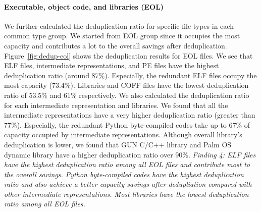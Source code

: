 \paragraph{Executable, object code, and libraries (EOL)}
We further calculated the deduplication ratio for specific file types in each common type group. We started from EOL group since it occupies the most capacity and contributes a lot to the overall savings after deduplication. 
%
Figure~\ref{fig:dedup-eol} shows the deduplication results for EOL files.
We see that ELF files, intermediate representations, and PE files have the highest deduplication ratio (around 87\%). Especially, the redundant ELF files occupy the most capacity (73.4\%). 
Libraries and COFF files have the lowest deduplication ratio of 53.5\% and 61\% respectively.
%
We also calculated the deduplication ratio for each intermediate representation and libraries. We found that all the intermediate representations have a very higher deduplication ratio (greater than 77\%). Especially, the redundant Python byte-compiled codes take up to 67\% of capacity occupied by intermediate representations. Although overall library's deduplication is lower, we found that GUN C/C++ library and Palm OS dynamic library have a higher deduplication ratio over 90\%.
%
\textit{Finding 4: ELF files have the highest deduplication ratio among all EOL files and contribute most to the overall savings. Python byte-compiled codes have the highest deduplication ratio and also achieve a better capacity savings after dedupliation compared with other intermediate representations. Most libraries have the lowest deduplication ratio among all EOL files.}
%
